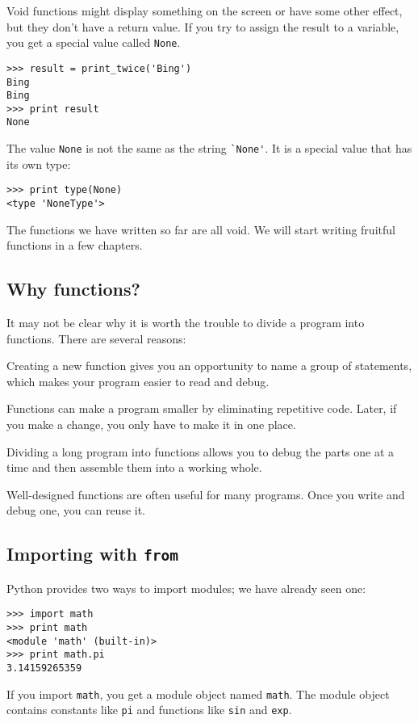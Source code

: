 \documentclass{article}
\begin{document}
Void functions might display something on the screen or have some
other effect, but they don’t have a return value. If you try to assign
the result to a variable, you get a special value called \verb|None|.
\begin{verbatim}
>>> result = print_twice('Bing')
Bing
Bing
>>> print result
None
\end{verbatim}
The value \verb|None| is not the same as the string \verb|`None'|.
It is a special value that has its own type:
\begin{verbatim}
>>> print type(None)
<type 'NoneType'>
\end{verbatim}
The functions we have written so far are all void. We will start
writing fruitful functions in a few chapters.

\subsection{Why functions?}
It may not be clear why it is worth the trouble to divide a program
into functions. There are several reasons:
\begin{itemize*}
    \item Creating a new function gives you an opportunity to name a group of
        statements, which makes your program easier to read and debug.
    \item Functions can make a program smaller by eliminating repetitive code.
        Later, if you make a change, you only have to make it in one place.
    \item Dividing a long program into functions allows you to debug the parts
        one at a time and then assemble them into a working whole.
    \item Well-designed functions are often useful for many programs. Once you
        write and debug one, you can reuse it.
\end{itemize*}

\subsection{Importing with \texttt{from}}
Python provides two ways to import modules; we have already seen one:
\begin{verbatim}
>>> import math
>>> print math
<module 'math' (built-in)>
>>> print math.pi
3.14159265359
\end{verbatim}
If you import \verb|math|, you get a module object named \verb|math|.
The module object contains constants like \verb|pi| and functions like
\verb|sin| and \verb|exp|.
\end{document}
